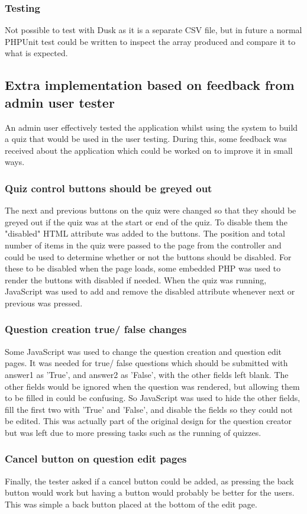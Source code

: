 \subsubsection{Testing}
Not possible to test with Dusk as it is a separate CSV file, but in future a normal PHPUnit test could be written to inspect the array produced and compare it to what is expected.
\newpage

\subsection{Extra implementation based on feedback from admin user tester}
An admin user effectively tested the application whilst using the system to build a quiz that would be used in the user testing. During this, some feedback was received about the application which could be worked on to improve it in small ways.
\subsubsection{Quiz control buttons should be greyed out}
The next and previous buttons on the quiz were changed so that they should be greyed out if the quiz was at the start or end of the quiz. To disable them the "disabled" HTML attribute was added to the buttons. The position and total number of items in the quiz were passed to the page from the controller and could be used to determine whether or not the buttons should be disabled. For these to be disabled when the page loads, some embedded PHP was used to render the buttons with disabled if needed. When the quiz was running, JavaScript was used to add and remove the disabled attribute whenever next or previous was pressed.
\subsubsection{Question creation true/ false changes}
Some JavaScript was used to change the question creation and question edit pages. It was needed for true/ false questions which should be submitted with answer1 as 'True', and answer2 as 'False', with the other fields left blank. The other fields would be ignored when the question was rendered, but allowing them to be filled in could be confusing. So JavaScript was used to hide the other fields, fill the first two with 'True' and 'False', and disable the fields so they could not be edited. This was actually part of the original design for the question creator but was left due to more pressing tasks such as the running of quizzes.
\subsubsection{Cancel button on question edit pages}
Finally, the tester asked if a cancel button could be added, as pressing the back button would work but having a button would probably be better for the users. This was simple a back button placed at the bottom of the edit page.

